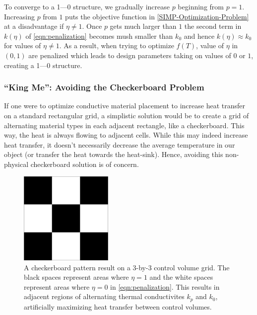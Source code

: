 To converge to a 1---0 structure, we gradually increase $p$ beginning from $p=1$. Increasing $p$ from $1$ puts the objective function in \eqref{SIMP-Optimization-Problem} at a disadvantage if $\eta\neq1$. Once $p$ gets much larger than $1$ the second term in $k(\eta)$ of \eqref{eqn:penalization} becomes mush smaller than $k_0$ and hence $k(\eta)\approx k_0$ for values of $\eta\neq1$. As a result, when trying to optimize $f(T)$, value of $\eta$ in $(0,1)$ are penalized which leads to design parameters taking on values of $0$ or $1$, creating a 1---0 structure.

\subsubsection*{``King Me'': Avoiding the Checkerboard Problem}

If one were to optimize conductive material placement to increase heat transfer on a standard rectangular grid, a simplistic solution would be to create a grid of alternating material types in each adjacent rectangle, like a checkerboard. This way, the heat is always flowing to adjacent cells. While this may indeed increase heat transfer, it doesn't necessarily decrease the average temperature in our object (or transfer the heat towards the heat-sink). Hence, avoiding this non-physical checkerboard solution is of concern.

\begin{figure}
	\centering
	\includegraphics[width=0.4\textwidth]{Chapter_II_SIMP_Optimization/Images/3x3-Checkerboard.png}
	\caption[Checkerboard Pattern]{A checkerboard pattern result on a 3-by-3 control volume grid. The black spaces represent areas where $\eta=1$ and the white spaces represent areas where $\eta=0$ in \eqref{eqn:penalization}. This results in adjacent regions of alternating thermal conductivites $k_p$ and $k_0$, artificially maximizing heat transfer between control volumes.}
	\label{fig:3x3-Checkerboard}
\end{figure}

